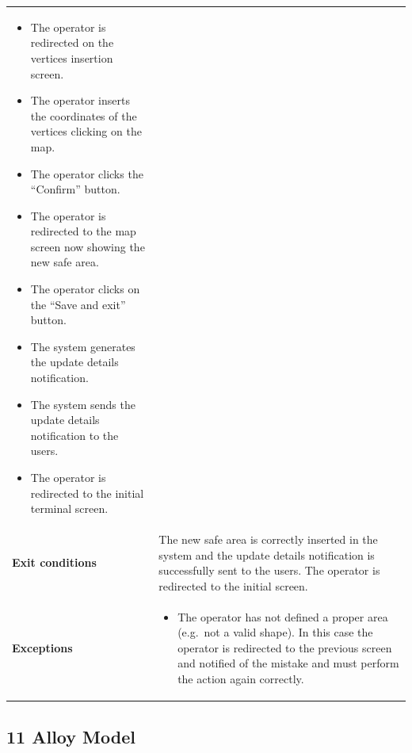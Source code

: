 \documentclass[]{article}
\providecommand{\tightlist}{%
  \setlength{\itemsep}{0pt}\setlength{\parskip}{0pt}}
\begin{document}
\begin{longtable}[]{@{}ll@{}}
\begin{minipage}[t]{0.65\columnwidth}
\begin{itemize}
\item
  The operator is redirected on the vertices insertion screen.
\item
  The operator inserts the coordinates of the vertices clicking on the
  map.
\item
  The operator clicks the ``Confirm'' button.
\item
  The operator is redirected to the map screen now showing the new safe
  area.
\item
  The operator clicks on the ``Save and exit'' button.
\item
  The system generates the update details notification.
\item
  The system sends the update details notification to the users.
\item
  The operator is redirected to the initial terminal screen.
\end{itemize}\strut
\end{minipage}\tabularnewline
\begin{minipage}[t]{0.29\columnwidth}\raggedright\strut
\textbf{Exit conditions}\strut
\end{minipage} & \begin{minipage}[t]{0.65\columnwidth}\raggedright\strut
The new safe area is correctly inserted in the system and the update
details notification is successfully sent to the users. The operator is
redirected to the initial screen.\strut
\end{minipage}\tabularnewline
\begin{minipage}[t]{0.29\columnwidth}\raggedright\strut
\textbf{Exceptions}\strut
\end{minipage} & \begin{minipage}[t]{0.65\columnwidth}\raggedright\strut
\begin{itemize}
\tightlist
\item
  The operator has not defined a proper area (e.g.~not a valid shape).
  In this case the operator is redirected to the previous screen and
  notified of the mistake and must perform the action again correctly.
\end{itemize}\strut
\end{minipage}\tabularnewline
\bottomrule
\end{longtable}

\newpage

\subsection{11 Alloy Model}\label{alloy-model}
\end{document}
